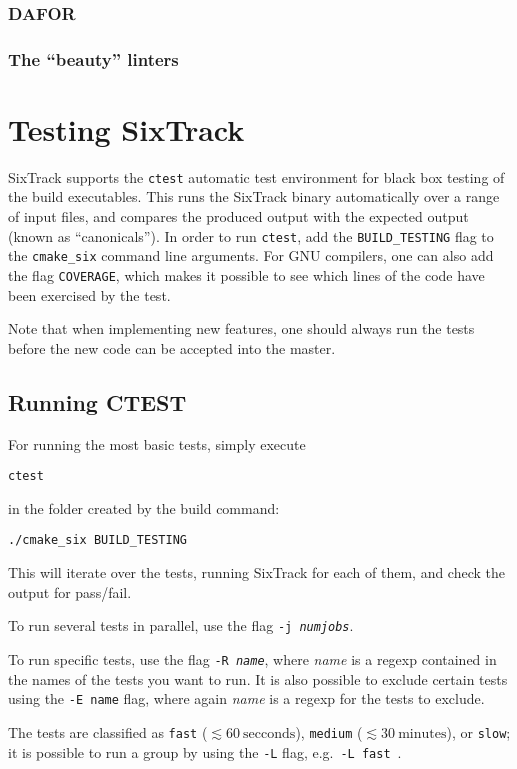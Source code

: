 \documentclass[english,BCOR=0mm,DIV=18]{scrartcl}
\begin{document}
\subsubsection{DAFOR}

\subsubsection{The ``beauty'' linters}


\section{Testing SixTrack}
\label{sec:testing}
SixTrack supports the \texttt{ctest} automatic test environment for black box testing of the build executables.
This runs the SixTrack binary automatically over a range of input files, and compares the produced output with the expected output (known as ``canonicals'').
In order to run \texttt{ctest}, add the \texttt{BUILD\_TESTING} flag to the \texttt{cmake\_six} command line arguments.
For GNU compilers, one can also add the flag \texttt{COVERAGE}, which makes it possible to see which lines of the code have been exercised by the test.

Note that when implementing new features, one should always run the tests before the new code can be accepted into the master.

\subsection{Running CTEST}
For running the most basic tests, simply execute
\begin{lstlisting}
ctest
\end{lstlisting}
in the folder created by the build command:
\begin{lstlisting}
./cmake_six BUILD_TESTING
\end{lstlisting}
This will iterate over the tests, running SixTrack for each of them, and check the output for pass/fail.

To run several tests in parallel, use the flag \texttt{-j \textit{numjobs}}.

To run specific tests, use the flag \texttt{-R \textit{name}}, where \textit{name} is a regexp contained in the names of the tests you want to run.
It is also possible to exclude certain tests using the \texttt{-E \texttt{name}} flag, where again \textit{name} is a regexp for the tests to exclude.

The tests are classified as \texttt{fast} ($\lesssim 60~\mathrm{secconds}$), \texttt{medium} ($\lesssim 30~\mathrm{minutes}$), or \texttt{slow}; it is possible to run a group by using the \texttt{-L} flag, e.g.\ \texttt{-L fast}~.
\end{document}
